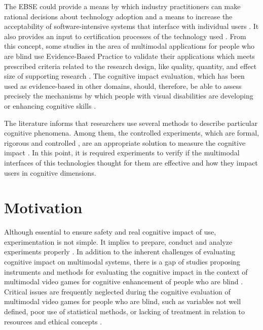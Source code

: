 The \gls{EBSE} could provide a means by which industry practitioners can make rational decisions about technology adoption and a means to increase the acceptability of software-intensive systems that interface with individual users \cite{Kitchenham2004a}. It also provides an input to certification processes of the technology used \cite{Kitchenham2004a}. From this concept, some studies in the area of multimodal applications for people who are blind use Evidence-Based Practice to validate their applications \cite{Sanchez2004,Sancheza} which meets prescribed criteria related to the research design, like quality, quantity, and effect size of supporting research \cite{Dalton2015AssistiveNeeds}\cite{Weber1998}. The cognitive impact evaluation, which has been used as evidence-based in other domains, should, therefore, be able to assess precisely the mechanisms by which people with visual disabilities are developing or enhancing cognitive skills \cite{Darin2015}.

The literature informs that researchers use several methods to describe particular cognitive phenomena. Among them, the controlled experiments, which are formal, rigorous and controlled \cite{Wohlin2000}, are an appropriate solution to measure the cognitive impact \cite{Sternberg2011}. In this point, it is required experiments to verify if the multimodal interfaces of this technologies \cite{Dumas2009} thought for them are effective and how they impact users in cognitive dimensions.

\section{Motivation}
\label{sec:introduction-motivation}

Although essential to ensure safety and real cognitive impact of use, experimentation is not simple. It implies to prepare, conduct and analyze experiments properly \cite{Wohlin2000}. In addition to the inherent challenges of evaluating cognitive impact on multimodal systems, there is a gap of studies proposing instruments and methods for evaluating the cognitive impact in the context of multimodal video games for cognitive enhancement of people who are blind \cite{Darin2015}. Critical issues are frequently neglected during the cognitive evaluation of multimodal video games for people who are blind, such as variables not well defined, poor use of statistical methods, or lacking of treatment in relation to resources and ethical concepts \cite{Mesquita2018CognitiveReview}.


